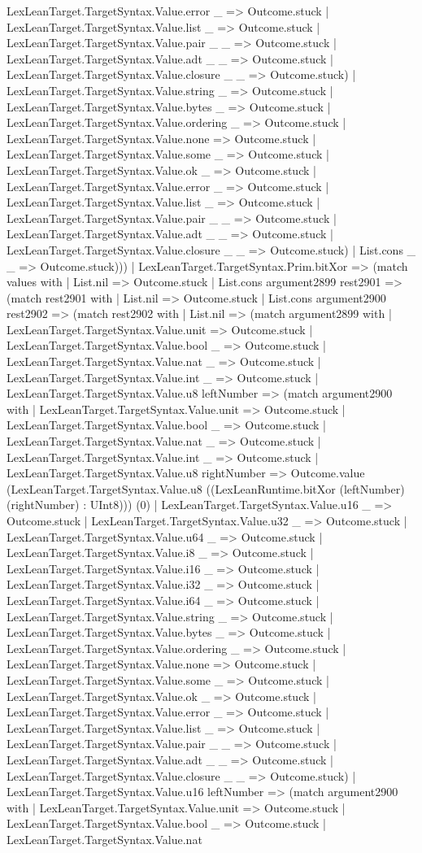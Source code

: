 \documentclass[11pt]{article}
\begin{document}
LexLeanTarget.TargetSyntax.Value.error \_ => Outcome.stuck | LexLeanTarget.TargetSyntax.Value.list \_ => Outcome.stuck | LexLeanTarget.TargetSyntax.Value.pair \_ \_ => Outcome.stuck | LexLeanTarget.TargetSyntax.Value.adt \_ \_ => Outcome.stuck | LexLeanTarget.TargetSyntax.Value.closure \_ \_ => Outcome.stuck) | LexLeanTarget.TargetSyntax.Value.string \_ => Outcome.stuck | LexLeanTarget.TargetSyntax.Value.bytes \_ => Outcome.stuck | LexLeanTarget.TargetSyntax.Value.ordering \_ => Outcome.stuck | LexLeanTarget.TargetSyntax.Value.none => Outcome.stuck | LexLeanTarget.TargetSyntax.Value.some \_ => Outcome.stuck | LexLeanTarget.TargetSyntax.Value.ok \_ => Outcome.stuck | LexLeanTarget.TargetSyntax.Value.error \_ => Outcome.stuck | LexLeanTarget.TargetSyntax.Value.list \_ => Outcome.stuck | LexLeanTarget.TargetSyntax.Value.pair \_ \_ => Outcome.stuck | LexLeanTarget.TargetSyntax.Value.adt \_ \_ => Outcome.stuck | LexLeanTarget.TargetSyntax.Value.closure \_ \_ => Outcome.stuck) | List.cons \_ \_ => Outcome.stuck))) | LexLeanTarget.TargetSyntax.Prim.bitXor => (match values with | List.nil => Outcome.stuck | List.cons argument2899 rest2901 => (match rest2901 with | List.nil => Outcome.stuck | List.cons argument2900 rest2902 => (match rest2902 with | List.nil => (match argument2899 with | LexLeanTarget.TargetSyntax.Value.unit => Outcome.stuck | LexLeanTarget.TargetSyntax.Value.bool \_ => Outcome.stuck | LexLeanTarget.TargetSyntax.Value.nat \_ => Outcome.stuck | LexLeanTarget.TargetSyntax.Value.int \_ => Outcome.stuck | LexLeanTarget.TargetSyntax.Value.u8 leftNumber => (match argument2900 with | LexLeanTarget.TargetSyntax.Value.unit => Outcome.stuck | LexLeanTarget.TargetSyntax.Value.bool \_ => Outcome.stuck | LexLeanTarget.TargetSyntax.Value.nat \_ => Outcome.stuck | LexLeanTarget.TargetSyntax.Value.int \_ => Outcome.stuck | LexLeanTarget.TargetSyntax.Value.u8 rightNumber => Outcome.value (LexLeanTarget.TargetSyntax.Value.u8 ((LexLeanRuntime.bitXor (leftNumber) (rightNumber) : UInt8))) (0) | LexLeanTarget.TargetSyntax.Value.u16 \_ => Outcome.stuck | LexLeanTarget.TargetSyntax.Value.u32 \_ => Outcome.stuck | LexLeanTarget.TargetSyntax.Value.u64 \_ => Outcome.stuck | LexLeanTarget.TargetSyntax.Value.i8 \_ => Outcome.stuck | LexLeanTarget.TargetSyntax.Value.i16 \_ => Outcome.stuck | LexLeanTarget.TargetSyntax.Value.i32 \_ => Outcome.stuck | LexLeanTarget.TargetSyntax.Value.i64 \_ => Outcome.stuck | LexLeanTarget.TargetSyntax.Value.string \_ => Outcome.stuck | LexLeanTarget.TargetSyntax.Value.bytes \_ => Outcome.stuck | LexLeanTarget.TargetSyntax.Value.ordering \_ => Outcome.stuck | LexLeanTarget.TargetSyntax.Value.none => Outcome.stuck | LexLeanTarget.TargetSyntax.Value.some \_ => Outcome.stuck | LexLeanTarget.TargetSyntax.Value.ok \_ => Outcome.stuck | LexLeanTarget.TargetSyntax.Value.error \_ => Outcome.stuck | LexLeanTarget.TargetSyntax.Value.list \_ => Outcome.stuck | LexLeanTarget.TargetSyntax.Value.pair \_ \_ => Outcome.stuck | LexLeanTarget.TargetSyntax.Value.adt \_ \_ => Outcome.stuck | LexLeanTarget.TargetSyntax.Value.closure \_ \_ => Outcome.stuck) | LexLeanTarget.TargetSyntax.Value.u16 leftNumber => (match argument2900 with | LexLeanTarget.TargetSyntax.Value.unit => Outcome.stuck | LexLeanTarget.TargetSyntax.Value.bool \_ => Outcome.stuck | LexLeanTarget.TargetSyntax.Value.nat 
\end{document}
